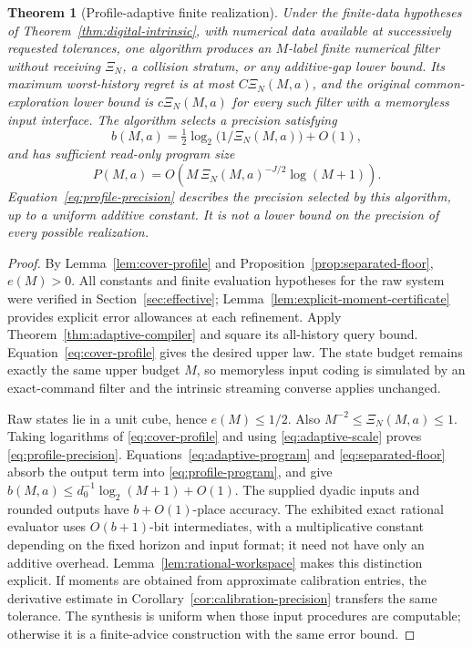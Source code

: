 \documentclass[11pt]{amsart}
\newtheorem{theorem}{Theorem}[section]
\theoremstyle{definition}\newtheorem{definition}[theorem]{Definition}
\theoremstyle{remark}\newtheorem{remark}[theorem]{Remark}
\begin{document}
\begin{theorem}[Profile-adaptive finite realization]
\label{thm:profile-adaptive}
Under the finite-data hypotheses of Theorem~\ref{thm:digital-intrinsic},
with numerical data available at successively requested tolerances,
one algorithm produces an $M$-label finite numerical filter without
receiving $\Xi_N$, a collision stratum, or any additive-gap lower bound.
Its maximum worst-history regret is at most $C\Xi_N(M,a)$, and the
original common-exploration lower bound is $c\Xi_N(M,a)$ for every
such filter with a memoryless input interface. The algorithm selects a
precision satisfying
\begin{equation}\label{eq:profile-precision}
 b(M,a)=\tfrac12\log_2\bigl(1/\Xi_N(M,a)\bigr)+O(1),
\end{equation}
and has sufficient read-only program size
\begin{equation}\label{eq:profile-program}
 P(M,a)=O\!\left(M\,\Xi_N(M,a)^{-J/2}\log(M+1)\right).
\end{equation}
Equation~\eqref{eq:profile-precision} describes the precision selected
by this algorithm, up to a uniform additive constant. It is not a
lower bound on the precision of every possible realization.
\end{theorem}
\begin{proof}
By Lemma~\ref{lem:cover-profile} and
Proposition~\ref{prop:separated-floor}, $e(M)>0$. All constants and
finite evaluation hypotheses for the raw system were verified in
Section~\ref{sec:effective}; Lemma~\ref{lem:explicit-moment-certificate}
provides explicit error allowances at each refinement. Apply
Theorem~\ref{thm:adaptive-compiler} and square its all-history query
bound. Equation~\eqref{eq:cover-profile} gives the desired upper law.
The state budget remains exactly the same upper budget $M$, so
memoryless input coding is simulated by an exact-command filter and
the intrinsic streaming converse applies unchanged.

Raw states lie in a unit cube, hence $e(M)\le1/2$. Also
$M^{-2}\le\Xi_N(M,a)\le1$. Taking logarithms of
\eqref{eq:cover-profile} and using \eqref{eq:adaptive-scale} proves
\eqref{eq:profile-precision}. Equations~\eqref{eq:adaptive-program}
and \eqref{eq:separated-floor} absorb the output term into
\eqref{eq:profile-program}, and give
$b(M,a)\le d_0^{-1}\log_2(M+1)+O(1)$.
The supplied dyadic inputs and rounded outputs have $b+O(1)$-place
accuracy. The exhibited exact rational evaluator uses $O(b+1)$-bit
intermediates, with a multiplicative constant depending on the fixed
horizon and input format; it need not have only an additive overhead.
Lemma~\ref{lem:rational-workspace} makes this distinction explicit. If moments are obtained from approximate calibration
entries, the derivative estimate in
Corollary~\ref{cor:calibration-precision} transfers the same tolerance.
The synthesis is uniform when those input procedures are computable;
otherwise it is a finite-advice construction with the same error bound.
\end{proof}
\end{document}
